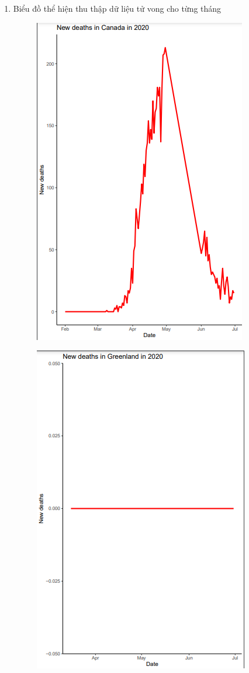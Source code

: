 \documentclass[a4paper]{article}
\theoremstyle{definition}
\begin{document}
\begin{enumerate}[i)]
\begin{enumerate}[1]
\begin{figure}[H]
		    	\end{figure}
			\item Biểu đồ thể hiện thu thập dữ liệu tử vong cho từng tháng
			\begin{figure}[H]
				\centering
				\includegraphics[scale=0.8]{images/5.2.1.png}
			\end{figure}
			\begin{figure}[H]
				\centering
				\includegraphics[scale=0.8]{images/5.2.2.png}

\end{figure}
\end{enumerate}
\end{enumerate}
\end{document}
